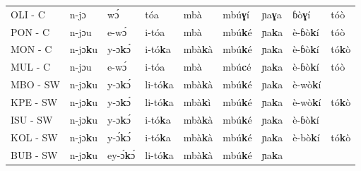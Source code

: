 \documentclass[output=paper,colorlinks,citecolor=brown
]{langscibook}
\begin{document}
\begin{table}[t]
{\begin{tabular}{lllllllll}
OLI - C                   & n-jɔ                       & wɔ́                   & tóa                    & mbà                  & mbú\textbf{ɣ}í                    & ɲa\textbf{ɣ}a                  & ɓò\textbf{ɣ}í                   & tóò                   \\
PON - C                   & n-jɔu                      & e-wɔ́                 & i-tóa                  & mbà                  & mbú\textbf{k}é                    & ɲa\textbf{k}a                  & è-ɓò\textbf{k}í                & tóò                   \\
MON - C                   & n-jɔ\textbf{k}u                     & y-ɔ\textbf{k}ɔ́                & i-tó\textbf{k}a                 & mbà\textbf{k}à               & mbú\textbf{k}é                    & ɲa\textbf{k}a                  & è-ɓò\textbf{k}í                & tó\textbf{k}ò                  \\
MUL - C                   & n-jɔu                      & e-wɔ́                 & i-tóa                  & mbà                  & mbú\textbf{c}é                    & ɲa\textbf{k}a                  & è-ɓò\textbf{k}í                & tóò                   \\
MBO - SW                  & n-jɔ\textbf{k}u                     & y-ɔ\textbf{k}ɔ́                & li-tó\textbf{k}a                & mbà\textbf{k}à               & mbú\textbf{k}é                    & ɲa\textbf{k}a                  & è-wò\textbf{k}í                &                         \\
KPE - SW                  & n-jɔ\textbf{k}u                     & y-ɔ\textbf{k}ɔ́                & li-tó\textbf{k}a                & mbà\textbf{k}ì               & mbú\textbf{k}é                    & ɲa\textbf{k}a                  & è-wò\textbf{k}í                & tó\textbf{k}ò                  \\
ISU - SW                  & n-jɔ\textbf{k}u                     & y-ɔ\textbf{k}ɔ́                & i-tó\textbf{k}a                 & mbà\textbf{k}à               & mbú\textbf{k}é                    & ɲa\textbf{k}a                  & è-ɓò\textbf{k}í                &                         \\
KOL - SW                  & n-jɔ\textbf{k}u                     & y-ɔ́\textbf{k}ɔ́               & i-tó\textbf{k}a                 & mbà\textbf{k}à               & mbú\textbf{k}é                    & ɲa\textbf{k}a                  & è-bò\textbf{k}í                & tó\textbf{k}ò                  \\
BUB - SW                  & n-jɔ\textbf{k}u                     & ey-ɔ́\textbf{k}ɔ́              & li-tó\textbf{k}a                & mbà\textbf{k}à               & mbú\textbf{k}é                    & ɲa\textbf{k}a                  &                          &                         \\

\end{tabular}}
\end{table}
\end{document}
